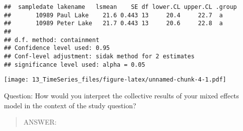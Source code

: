 \documentclass[]{article}
\newenvironment{Shaded}{\begin{snugshade}}{\end{snugshade}}
\newcommand{\KeywordTok}[1]{\textcolor[rgb]{0.13,0.29,0.53}{\textbf{#1}}}
\newcommand{\DataTypeTok}[1]{\textcolor[rgb]{0.13,0.29,0.53}{#1}}
\newcommand{\FloatTok}[1]{\textcolor[rgb]{0.00,0.00,0.81}{#1}}
\newcommand{\StringTok}[1]{\textcolor[rgb]{0.31,0.60,0.02}{#1}}
\newcommand{\CommentTok}[1]{\textcolor[rgb]{0.56,0.35,0.01}{\textit{#1}}}
\newcommand{\OperatorTok}[1]{\textcolor[rgb]{0.81,0.36,0.00}{\textbf{#1}}}
\newcommand{\NormalTok}[1]{#1}
\begin{document}
\begin{verbatim}
##  sampledate lakename   lsmean    SE df lower.CL upper.CL .group
##       10989 Paul Lake    21.6 0.443 13     20.4     22.7  a    
##       10989 Peter Lake   21.7 0.443 13     20.6     22.8  a    
## 
## d.f. method: containment 
## Confidence level used: 0.95 
## Conf-level adjustment: sidak method for 2 estimates 
## significance level used: alpha = 0.05
\end{verbatim}

\begin{Shaded}
\end{Shaded}

\texttt{[image: 13\_TimeSeries\_files/figure-latex/unnamed-chunk-4-1.pdf]}

Question: How would you interpret the collective results of your mixed
effects model in the context of the study question?

\begin{quote}
ANSWER:
\end{quote}
\end{document}
